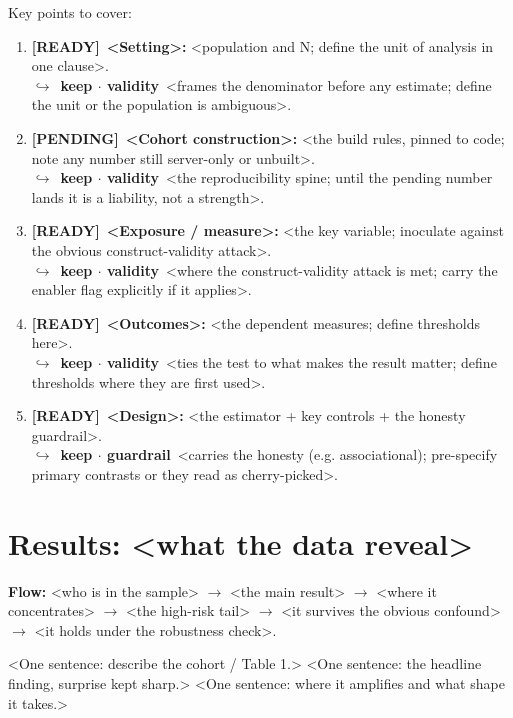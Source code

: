 \documentclass[11pt]{article}
\newcommand{\rdy}{\textcolor{cReady}{\textbf{[READY]}}}   %
\newcommand{\pend}{\textcolor{cPend}{\textbf{[PENDING]}}} %
\newcommand{\rev}[2]{\\{\footnotesize\color{gray}$\hookrightarrow$~\textbf{#1}~#2}}
\begin{document}
Key points to cover:
\begin{enumerate}
\item \rdy~\textbf{<Setting>:} <population and N; define the unit of analysis in one clause>. \rev{keep $\cdot$ validity}{<frames the denominator before any estimate; define the unit or the population is ambiguous>.}
\item \pend~\textbf{<Cohort construction>:} <the build rules, pinned to code; note any number still server-only or unbuilt>. \rev{keep $\cdot$ validity}{<the reproducibility spine; until the pending number lands it is a liability, not a strength>.}
\item \rdy~\textbf{<Exposure / measure>:} <the key variable; inoculate against the obvious construct-validity attack>. \rev{keep $\cdot$ validity}{<where the construct-validity attack is met; carry the enabler flag explicitly if it applies>.}
\item \rdy~\textbf{<Outcomes>:} <the dependent measures; define thresholds here>. \rev{keep $\cdot$ validity}{<ties the test to what makes the result matter; define thresholds where they are first used>.}
\item \rdy~\textbf{<Design>:} <the estimator + key controls + the honesty guardrail>. \rev{keep $\cdot$ guardrail}{<carries the honesty (e.g. associational); pre-specify primary contrasts or they read as cherry-picked>.}
\end{enumerate}

\section*{Results: <what the data reveal>}

\noindent\textbf{Flow:} <who is in the sample> $\rightarrow$ <the main result> $\rightarrow$ <where it concentrates> $\rightarrow$ <the high-risk tail> $\rightarrow$ <it survives the obvious confound> $\rightarrow$ <it holds under the robustness check>.

<One sentence: describe the cohort / Table 1.>
%
<One sentence: the headline finding, surprise kept sharp.>
%
<One sentence: where it amplifies and what shape it takes.>
\end{document}
